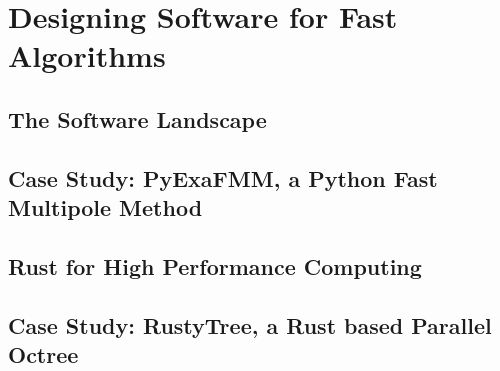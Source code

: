 \chapter{Designing Software for Fast Algorithms}\label{chpt:2}


\section{The Software Landscape}\label{sec:2_1}


\section{Case Study: PyExaFMM, a Python Fast Multipole Method}\label{sec:2_2}


\section{Rust for High Performance Computing}\label{sec:2_3}


\section{Case Study: RustyTree, a Rust based Parallel Octree}\label{sec:2_4}


